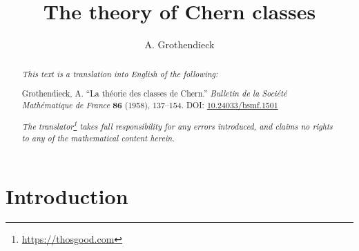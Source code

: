 \documentclass{article}
\title{The theory of Chern classes}
\author{A. Grothendieck}
\date{}
\newcommand{\oldpage}[1]{\marginpar{\footnotesize$\Big\vert$ \textit{p.~#1}}}
\begin{document}
\maketitle
\thispagestyle{fancy}

\renewcommand{\abstractname}{Translator's note}

\begin{abstract}
  \renewcommand*{\thefootnote}{\fnsymbol{footnote}}
  \emph{This text is a translation into English of the following:}

  \medskip\noindent
  Grothendieck, A. ``La théorie des classes de Chern.'' \emph{Bulletin de la Société Mathématique de France} \textbf{86} (1958), 137--154. DOI: \href{https://www.doi.org/10.24033/bsmf.1501}{10.24033/bsmf.1501}

  \medskip\noindent
  \emph{The translator\footnote{\url{https://thosgood.com}} takes full responsibility for any errors introduced, and claims no rights to any of the mathematical content herein.}
\end{abstract}

\setcounter{footnote}{0}

\tableofcontents



\providecommand{\HH}{\operatorname{H}}
\providecommand{\rank}{\operatorname{rank}}
\providecommand{\cl}{\operatorname{cl}}
\providecommand{\PP}{\mathbf{P}}

\providecommand{\scr}[1]{{\mathscr{#1}}}
\renewcommand{\cal}[1]{{\mathcal{#1}}}

\renewcommand{\geq}{\geqslant}
\renewcommand{\leq}{\leqslant}

\hypertarget{introduction}{%
\section*{Introduction}\label{introduction}}

\oldpage{137}
\end{document}
